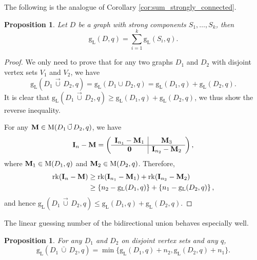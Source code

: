 \documentclass[a4paper, 11pt]{book}
\numberwithin{equation}{section}
\theoremstyle{plain}
\newtheorem{proposition}[equation]	{Proposition}
\newcommand{\vcup}{\,\vec{\cup}\,}
\newcommand{\bcup}{\,\bar{\cup}\,}
\newcommand{\linear}[1]{#1_\mathrm{L}}
\newcommand{\matrices}{\mathrm{M}}
\newcommand{\guessing}{\mathrm{g}}
\newcommand{\linearGuessing}{\linear{\guessing}}
\newcommand{\rank}{\mathrm{rk}}
\renewcommand{\(}{\ldbrack}
\renewcommand{\)}{\rdbrack}
\begin{document}
The following is the analogue of Corollary \ref{cor:sum_strongly_connected}.

\begin{proposition} \label{prop:gl_strong}
Let $D$ be a graph with strong components $S_1, \dots, S_k$, then
\[
	\linearGuessing(D,q) = \sum_{i=1}^k \linearGuessing(S_i, q).
\]
\end{proposition}


\begin{proof} \renewcommand*{\arraystretch}{1.5}
We only need to prove that for any two graphs $D_1$ and $D_2$ with disjoint vertex sets $V_1$ and $V_2$, we have
\[
	\linearGuessing(D_1 \vcup D_2, q) = \linearGuessing(D_1 \cup D_2, q) = \linearGuessing(D_1, q) + \linearGuessing(D_2, q).
\]
It is clear that $\linearGuessing(D_1 \vcup D_2, q) \ge  \linearGuessing(D_1, q) + \linearGuessing(D_2, q)$, we thus show the reverse inequality.


For any ${\bf M} \in \matrices(D_1 \vcup D_2, q)$, we have
\[
	{\bf I}_n - {\bf M} = \left(\begin{array}{c|c}
	{\bf I}_{n_1} - {\bf M}_1 & {\bf M}_3\\
	\hline
	{\bf 0} & {\bf I}_{n_2} - {\bf M}_2
	\end{array}\right),
\]
where ${\bf M}_1 \in \matrices(D_1, q)$ and ${\bf M}_2 \in \matrices(D_2, q)$. Therefore,
\begin{align*}
	\rank({\bf I}_n - {\bf M}) &\ge \rank({\bf I}_{n_1} - {\bf M}_1) + \rank({\bf I}_{n_2} - {\bf M}_2)\\
	&\ge \left\{n_2 - \linearGuessing(D_1, q) \right\} + \left\{ n_1 - \linearGuessing(D_2, q) \right\},
\end{align*}
and hence $\linearGuessing(D_1 \vcup D_2, q) \le \linearGuessing(D_1, q) + \linearGuessing(D_2, q)$.
\end{proof}


The linear guessing number of the bidirectional union behaves especially well.

\begin{proposition} \label{prop:gl_bidirectional}
For any $D_1$ and $D_2$ on disjoint vertex sets and any $q$,
\[
	\linearGuessing(D_1 \bcup D_2, q) = \min\{ \linearGuessing(D_1, q) + n_2, \linearGuessing(D_2, q) + n_1 \}.
\]
\end{proposition}
\end{document}
